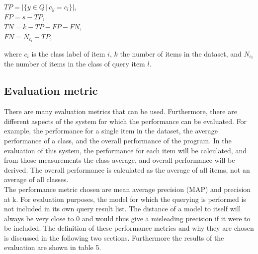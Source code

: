 \documentclass{bigdata}
\begin{document}
\begin{center}
	$TP = |\{y \in Q\, |\, c_y = c_l\}|$,\\
	$FP = s - TP$,\\
	$TN = k - TP - FP - FN$,\\
	$FN = N_{c_l} - TP$,\\
\end{center}

\noindent where $c_i$ is the class label of item $i$, $k$ the number of items in the dataset, and $N_{c_l}$ the number of items in the class of query item $l$.  

\subsection{Evaluation metric}
There are many evaluation metrics that can be used. Furthermore, there are different aspects of the system for which the performance can be evaluated. For example, the performance for a single item in the dataset, the average performance of a class, and the overall performance of the program. In the evaluation of this system, the performance for each item will be calculated, and from those measurements the class average, and overall performance will be derived. The overall performance is calculated as the average of all items, not an average of all classes.\\
The performance metric chosen are mean average precision (MAP) and precision at k. For evaluation purposes, the model for which the querying is performed is not included in its own query result list. The distance of a model to itself will always be very close to 0 and would thus give a misleading precision if it were to be included. The definition of these performance metrics and why they are chosen is discussed in the following two sections. Furthermore the results of the evaluation are shown in table 5.
\end{document}
